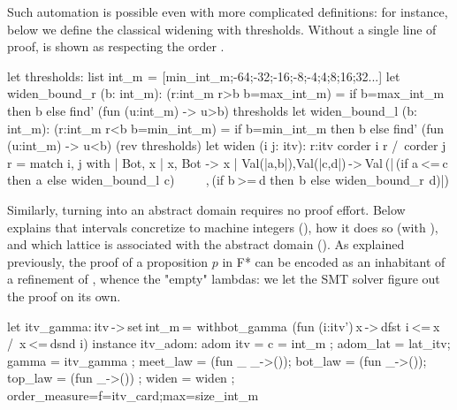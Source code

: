 \documentclass{llncs}
\begin{document}
%
Such automation is possible even with more complicated
definitions: for instance, below we define the classical widening
with thresholds.
%
Without a single line of proof,  is shown as
respecting the order .
%
\begin{fstarcode}
let thresholds: list int_m  =  [min_int_m;-64;-32;-16;-8;-4;4;8;16;32...]
let widen_bound_r (b: int_m): (r:int_m {r>b \/ b=max_int_m}) =
  if b=max_int_m then b else find' (fun (u:int_m) -> u>b) thresholds
let widen_bound_l (b: int_m): (r:int_m {r<b \/ b=min_int_m}) =
  if b=min_int_m then b else find' (fun (u:int_m) -> u<b) (rev thresholds)
let widen (i j: itv): r:itv {corder i r /\ corder j r}
  = match i, j with | Bot, x | x, Bot -> x
  | Val(|a,b|),Val(|c,d|) -> Val (| (if a <= c then  a  else  widen_bound_l  c)
                              , (if b >= d then  b  else  widen_bound_r  d)|)
\end{fstarcode}
%
Similarly, turning  into an abstract domain requires
no proof effort.
%
Below  explains that intervals concretize to
machine integers (), how it does so (with
), and which lattice is associated with
the abstract domain ().
%
As explained previously, the proof of a proposition $p$ in F* can
be encoded as an inhabitant of a refinement of ,
whence the "empty" lambdas: we let the SMT solver figure out the
proof on its own.
%
\begin{fstarcode}
let itv_gamma: itv -> set int_m =  withbot_gamma  (fun (i:itv') x -> dfst i <= x /\ x <= dsnd i)
instance itv_adom: adom itv = { c = int_m   ; adom_lat = lat_itv; gamma = itv_gamma
    ; meet_law = (fun _ _->()); bot_law = (fun _->());  top_law = (fun _->())
    ; widen = widen     ; order_measure={f=itv_card;max=size_int_m}}
\end{fstarcode}
%
\end{document}
